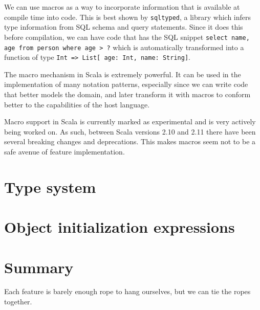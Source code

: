 We can use macros as a way to incorporate information that is available at compile time into code. This is best shown by \texttt{sqltyped}, a library which infers type information from SQL schema and query statements. Since it does this before compilation, we can have code that has the SQL snippet \texttt{select name, age from person where age > ?} which is automatically transformed into a function of type \texttt{Int => List[{ age: Int, name: String}]}.

The macro mechanism in Scala is extremely powerful. It can be used in the implementation of many notation patterns, especially since we can write code that better models the domain, and later transform it with macros to conform better to the capabilities of the host language.

Macro support in Scala is currently marked as experimental and is very actively being worked on. As such, between Scala versions 2.10 and 2.11 there have been several breaking changes and deprecations. This makes macros seem not to be a safe avenue of feature implementation.

\section{Type system}



\section{Object initialization expressions}

\section{Summary}
Each feature is barely enough rope to hang ourselves, but we can tie the ropes together.
